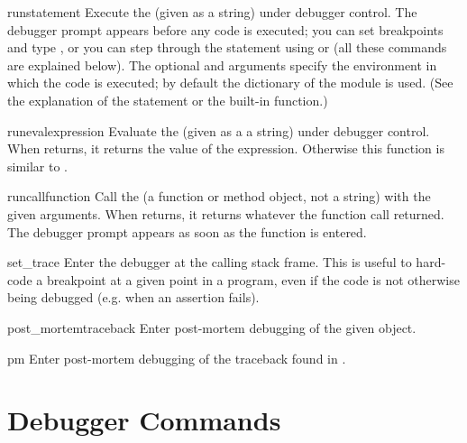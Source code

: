 \begin{funcdesc}{run}{statement}
Execute the  (given as a string) under debugger
control.  The debugger prompt appears before any code is executed; you
can set breakpoints and type , or you can step through
the statement using  or  (all these commands are
explained below).  The optional  and 
arguments specify the environment in which the code is executed; by
default the dictionary of the module  is
used.  (See the explanation of the  statement or the
 built-in function.)
\end{funcdesc}

\begin{funcdesc}{runeval}{expression}
Evaluate the  (given as a a string) under debugger
control.  When  returns, it returns the value of the
expression.  Otherwise this function is similar to
.
\end{funcdesc}

\begin{funcdesc}{runcall}{function}
Call the  (a function or method object, not a string)
with the given arguments.  When  returns, it returns
whatever the function call returned.  The debugger prompt appears as
soon as the function is entered.
\end{funcdesc}

\begin{funcdesc}{set_trace}{}
Enter the debugger at the calling stack frame.  This is useful to
hard-code a breakpoint at a given point in a program, even if the code
is not otherwise being debugged (e.g. when an assertion fails).
\end{funcdesc}

\begin{funcdesc}{post_mortem}{traceback}
Enter post-mortem debugging of the given  object.
\end{funcdesc}

\begin{funcdesc}{pm}{}
Enter post-mortem debugging of the traceback found in
.
\end{funcdesc}


\section{Debugger Commands \label{debugger-commands}}

